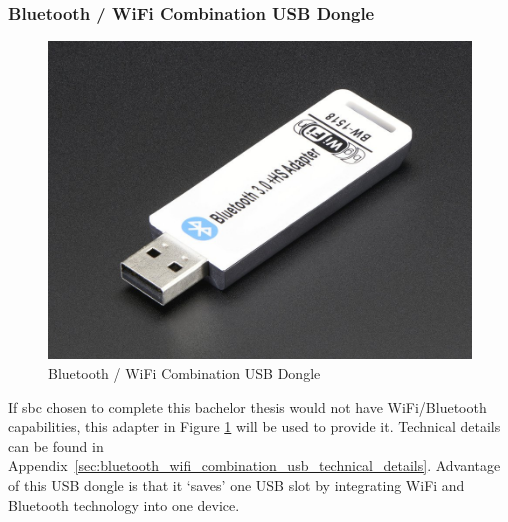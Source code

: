 \subsubsection{Bluetooth / WiFi Combination USB Dongle} %
\label{ssub:bluetooth_wifi_combination_usb_dongle}
\begin{figure}[H]
\begin{center}
\captionsetup{font=small}
\includegraphics[scale=0.2]{pics/dongle.jpg}
\caption{Bluetooth / WiFi Combination USB Dongle\cite{wifi_pic}}
\label{fig:wifi}
\end{center}
\end{figure}
If \gls{sbc} chosen to complete this bachelor thesis would not have WiFi/Bluetooth capabilities, this adapter in Figure \ref{fig:wifi} will be used to provide it. Technical details can be found in Appendix~\ref{sec:bluetooth_wifi_combination_usb_technical_details}. Advantage of this USB dongle is that it `saves' one USB slot by integrating WiFi and Bluetooth technology into one device.
